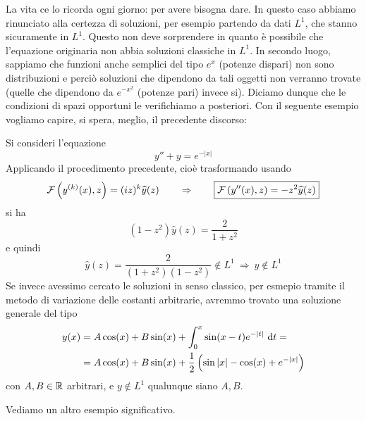 La vita ce lo ricorda ogni giorno: per avere bisogna dare. In questo caso abbiamo rinunciato alla certezza di soluzioni, per esempio partendo da dati $L^1$, che stanno sicuramente in $L^1$. Questo non deve sorprendere in quanto è possibile che l'equazione originaria non abbia soluzioni classiche in $L^1$. In secondo luogo, sappiamo che funzioni anche semplici del tipo $e^x$ (potenze dispari) non sono distribuzioni e perciò soluzioni che dipendono da tali oggetti non verranno trovate (quelle che dipendono da $e^{-x^2}$ (potenze pari) invece si). Diciamo dunque che le condizioni di spazi opportuni le verifichiamo a posteriori. Con il seguente esempio vogliamo capire, si spera, meglio, il precedente discorso:
\begin{exa}
Si consideri l'equazione
\begin{equation*}
y''+y=e^{-|x|}
\end{equation*}
Applicando il procedimento precedente, cioè trasformando usando
\begin{equation*}
\mathcal{F}\left(y^{(k)}(x),z\right)=(iz)^k\widehat{y}(z)\qquad\Rightarrow\qquad\boxed{\mathcal{F}\left(y''(x),z\right)=-z^2\widehat{y}(z)}
\end{equation*}
si ha
\begin{equation*}
(1-z^2)\hat{y}(z)=\frac{2}{1+z^2}
\end{equation*}
e quindi
\begin{equation*}
\hat{y}(z)=\frac{2}{(1+z^2)(1-z^2)}\notin L^1\ \Rightarrow\ y\notin L^1
\end{equation*}
Se invece avessimo cercato le soluzioni in senso classico, per esmepio tramite il metodo di variazione delle costanti arbitrarie, avremmo trovato una soluzione generale del tipo
\begin{align*}
y(x)&=A\cos(x)+B\sin(x)+\int_0^x\sin(x-t)e^{-|t|}\  \mathrm{d} t =\\
&=A\cos(x)+B\sin(x)+\frac{1}{2}\left(\sin|x|-\cos(x)+e^{-|x|}\right)
\end{align*}
con $A,B\in\mathbb{R}$ arbitrari, e $y\notin L^1$ qualunque siano $A,B$.
\end{exa}

Vediamo un altro esempio significativo.

